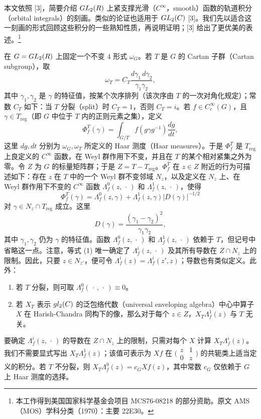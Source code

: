 本文依照 [3]，简要介绍 $GL_2(R)$ 上紧支撑光滑（$C^\infty$，smooth）函数的轨道积分（orbital integrals）的刻画。类似的论证也适用于 $GL_2(C)$ [3]。我们先以适合这一刻画的形式回顾这些积分的一些熟知性质，再说明证明；[3] 给出了更优美的表述。\footnote{本工作得到美国国家科学基金会项目 MCS76-08218 的部分资助。原文 AMS（MOS）学科分类（1970）：主要 22E30。}

在 $G=GL_2(R)$ 上固定一个不变 $4$ 形式 $\omega_G$。若 $T$ 是 $G$ 的 Cartan 子群（Cartan subgroup），取
\[
 \omega_T=C_T\frac{d\gamma_1\,d\gamma_2}{\gamma_1\gamma_2},
\]
其中 $\gamma_1,\gamma_2$ 是 $\gamma$ 的特征值，按某个次序排列（该次序由 $T$ 的一次对角化规定）；常数 $C_T$ 如下：当 $T$ 分裂（split）时 $C_T=1$，否则 $C_T=i$。若 $f\in C_c^\infty(G)$，且 $\gamma\in T_{\mathrm{reg}}$（即 $G$ 中位于 $T$ 内的正则元素之集），定义
\[
 \Phi_f^T(\gamma)=\int_{G/T}f(g\gamma g^{-1})\frac{dg}{dt},
\]
这里 $dg,dt$ 分别为 $\omega_G,\omega_T$ 所定义的 Haar 测度（Haar measures）。于是 $\Phi_f^T$ 是 $T_{\mathrm{reg}}$ 上良定义的 $C^\infty$ 函数，在 Weyl 群作用下不变，并且在 $T$ 的某个相对紧集之外为零。令 $Z$ 为 $G$ 的标量矩阵群；于是 $Z=T-T_{\mathrm{reg}}$。$\Phi_f^T$ 在 $z\in Z$ 附近的行为可描述如下：存在 $z$ 在 $T$ 中的一个 Weyl 群不变邻域 $N_z$，以及定义在 $N_z$ 上、在 Weyl 群作用下不变的 $C^\infty$ 函数 $\Lambda_f^0(z,\,\cdot\,)$ 和 $\Lambda_f^1(z,\,\cdot\,)$，使得
\begin{equation}
 \Phi_f^T(\gamma)=\Lambda_f^0(z,\gamma)+\Lambda_f^1(z,\gamma)|D(\gamma)|^{-1/2}
 \tag{1}
\end{equation}
对 $\gamma\in N_z\cap T_{\mathrm{reg}}$ 成立。这里
\[
 D(\gamma)=\frac{(\gamma_1-\gamma_2)^2}{\gamma_1\gamma_2},
\]
其中 $\gamma_1,\gamma_2$ 仍为 $\gamma$ 的特征值。函数 $\Lambda_f^0(z,\,\cdot\,)$ 和 $\Lambda_f^1(z,\,\cdot\,)$ 依赖于 $T$，但记号中省略这一点。注意，等式 (1) 唯一确定了 $\Lambda_f^i(z,\,\cdot\,)$ 及其所有导数在 $Z\cap N_z$ 上的限制。因此，只要 $z\in N_{z'}$，便可令 $\Lambda_f^i(z)=\Lambda_f^i(z',z)$；导数也有类似定义。此外：
\begin{enumerate}
\item[(a)] 若 $T$ 分裂，则可取 $\Lambda_f^0(\,\cdot\,,\,\cdot\,)\equiv0$。
\item[(b)] 若 $X_T$ 表示 $gl_2(C)$ 的泛包络代数（universal enveloping algebra）中心中算子 $X$ 在 Harish-Chandra 同构下的像，那么对于每个 $z\in Z$，$X_T\Lambda_f^1(z)$ 与 $T$ 无关。
\end{enumerate}
要确定 $\Lambda_f^i(z,\,\cdot\,)$ 的导数在 $Z\cap N_z$ 上的限制，只需对每个 $X$ 计算 $X_T\Lambda_f^i(z)$。我们不需要显式写出 $X_T\Lambda_f^1(z)$；该值可表示为 $Xf$ 在 $\bigl(\begin{smallmatrix}z&1\\0&z\end{smallmatrix}\bigr)$ 的共轭类上适当定义的积分。若 $T$ 不分裂，则 $X_T\Lambda_f^0(z)=c_GXf(z)$，其中常数 $c_G$ 仅依赖于 $G$ 上 Haar 测度的选择。

